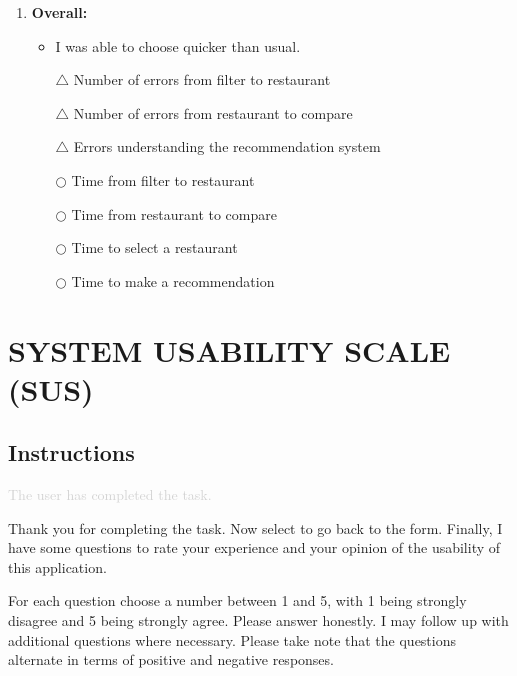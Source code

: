 \documentclass[a4 paper, 10pt]{article}
\begin{document}
\begin{multicols}{2}
\begin{enumerate}
    \item \textbf{Overall:}
        \begin{itemize}
            \item I was able to choose quicker than usual.
            \item[$\triangle$] Number of errors from filter to restaurant
            \item[$\triangle$] Number of errors from restaurant to compare  
            \item[$\triangle$] Errors understanding the recommendation system
            \item[$\bigcirc$] Time from filter to restaurant
            \item[$\bigcirc$] Time from restaurant to compare
            \item[$\bigcirc$] Time to select a restaurant
            \item[$\bigcirc$] Time to make a recommendation 
        \end{itemize}
    \end{enumerate}
\end{multicols}

\section*{SYSTEM USABILITY SCALE (SUS)}
    \subsection*{Instructions}
        \textcolor{lightgray}{The user has completed the task.}

        \begin{itshape}
            Thank you for completing the task. Now select to go back to the form. Finally, I have some questions to rate your experience and your opinion of the usability of this application. 

            For each question choose a number between 1 and 5, with 1 being strongly disagree and 5 being strongly agree. Please answer honestly. I may follow up with additional questions where necessary. Please take note that the questions alternate in terms of positive and negative responses. 
        \end{itshape}
\end{document}
